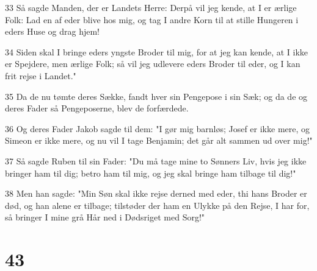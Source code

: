 \par 33 Så sagde Manden, der er Landets Herre: Derpå vil jeg kende, at I er ærlige Folk: Lad en af eder blive hos mig, og tag I andre Korn til at stille Hungeren i eders Huse og drag hjem!
\par 34 Siden skal I bringe eders yngste Broder til mig, for at jeg kan kende, at I ikke er Spejdere, men ærlige Folk; så vil jeg udlevere eders Broder til eder, og I kan frit rejse i Landet."
\par 35 Da de nu tømte deres Sække, fandt hver sin Pengepose i sin Sæk; og da de og deres Fader så Pengeposerne, blev de forfærdede.
\par 36 Og deres Fader Jakob sagde til dem: "I gør mig barnløs; Josef er ikke mere, og Simeon er ikke mere, og nu vil I tage Benjamin; det går alt sammen ud over mig!"
\par 37 Så sagde Ruben til sin Fader: "Du må tage mine to Sønners Liv, hvis jeg ikke bringer ham til dig; betro ham til mig, og jeg skal bringe ham tilbage til dig!"
\par 38 Men han sagde: "Min Søn skal ikke rejse derned med eder, thi hans Broder er død, og han alene er tilbage; tilstøder der ham en Ulykke på den Rejse, I har for, så bringer I mine grå Hår ned i Dødsriget med Sorg!"

\chapter{43}

